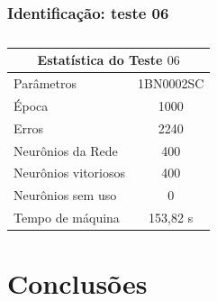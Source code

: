 \documentclass[aspectratio=10]{beamer} %
\begin{document}
\begin{frame}
	\frametitle{Identificação: teste 06}
\begin{table}[H]
	\centering
	\caption{}
	\label{Estatistica do teste $06$}
	\begin{tabular}{@{}lc@{}}
		\toprule
		\multicolumn{2}{c}{Estatística do Teste $06$}         \\ \midrule
		Parâmetros                  & 1BN0002SC \\
		Época                       & 1000       \\
		Erros                       & 2240       \\
		Neurônios da Rede           & 400       \\
		Neurônios vitoriosos        & 400       \\
		Neurônios sem uso           & 0         \\
		Tempo de máquina            & 153,82 s   \\ \bottomrule
	\end{tabular}
\end{table} 
\end{frame}


\section{Conclusões}
\end{document}
